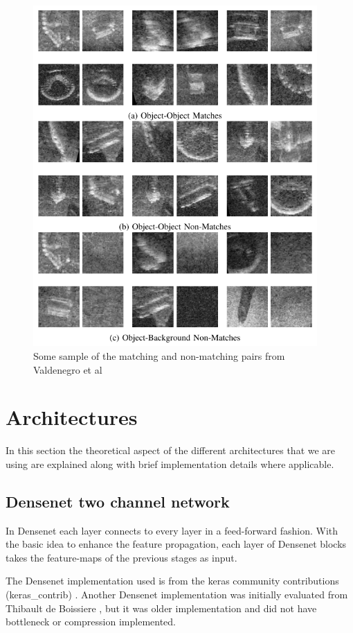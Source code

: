 \begin{figure}[ht]
\centering
\includegraphics[height= 13cm]{images/densenet/generated_patches}
\caption{Some sample of the matching and non-matching pairs from Valdenegro et al \cite{stateoftheart}}
\label{fig:generated_patches}
\end{figure}

\flushbottom
\newpage
\section{Architectures}
In this section the theoretical aspect of the different architectures that we are using are explained along with brief implementation details where applicable. %
\subsection{Densenet two channel network}
In Densenet each layer connects to every layer in a feed-forward fashion. 
With the basic idea to enhance the feature propagation, each layer of Densenet blocks takes the feature-maps of the previous stages as input.  

The Densenet implementation used is from the keras community contributions (keras\_contrib)  \cite{kerasdensenet}. Another Densenet implementation was initially evaluated from Thibault de Boissiere \cite{densenetold}, but it was older 
implementation and did not have bottleneck or compression implemented. 

